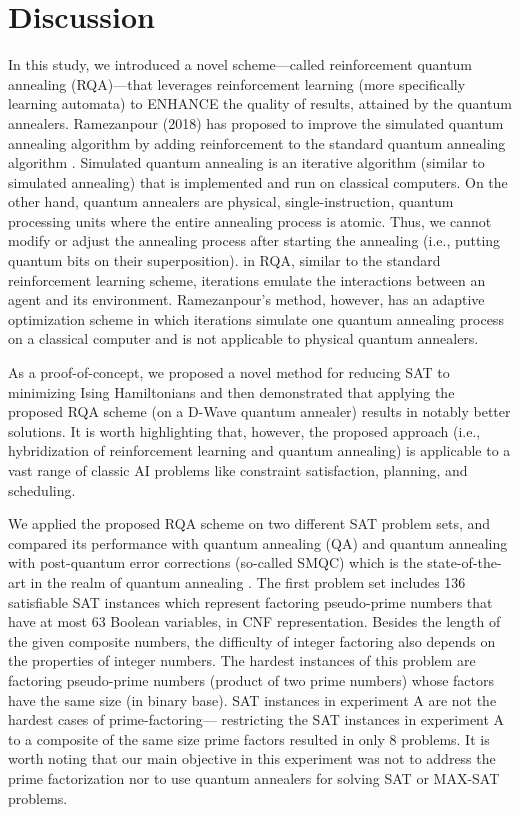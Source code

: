 \documentclass[fleqn,10pt]{wlscirep}
\begin{document}
\section*{Discussion}
In this study, we introduced a novel scheme—called reinforcement quantum annealing (RQA)—that leverages reinforcement learning (more specifically learning automata) to ENHANCE the quality of results, attained by the quantum annealers.
Ramezanpour (2018) has proposed to improve the simulated quantum annealing algorithm by adding reinforcement to the standard quantum annealing algorithm \cite{ramezanpour2018enhancing}. Simulated quantum annealing is an iterative algorithm (similar to simulated annealing) that is implemented and run on classical computers. On the other hand, quantum annealers are physical, single-instruction, quantum processing units where the entire annealing process is atomic. Thus, we cannot modify or adjust the annealing process after starting the annealing (i.e., putting quantum bits on their superposition). in RQA, similar to the standard reinforcement learning scheme, iterations emulate the interactions between an agent and its environment. Ramezanpour’s method, however, has an adaptive optimization scheme in which iterations simulate one quantum annealing process on a classical computer and is not applicable to physical quantum annealers.

As a proof-of-concept, we proposed a novel method for reducing SAT to minimizing Ising Hamiltonians and then demonstrated that applying the proposed RQA scheme (on a D-Wave quantum annealer) results in notably better solutions. It is worth highlighting that, however, the proposed approach (i.e., hybridization of reinforcement learning and quantum annealing) is applicable to a vast range of classic AI problems like constraint satisfaction, planning, and scheduling. 

We applied the proposed RQA scheme on two different SAT problem sets, and compared its performance with quantum annealing (QA) and quantum annealing with post-quantum error corrections (so-called SMQC) which is the state-of-the-art in the realm of quantum annealing \cite{golden2019pre,ayanzadeh2019quantum_assisted,dorband2018method}.
The first problem set includes 136 satisfiable SAT instances which represent factoring pseudo-prime numbers that have at most 63 Boolean variables, in CNF representation. Besides the length of the given composite numbers, the difficulty of integer factoring also depends on the properties of integer numbers. The hardest instances of this problem are factoring pseudo-prime numbers (product of two prime numbers) whose factors have the same size (in binary base). SAT instances in experiment A are not the hardest cases of prime-factoring— restricting the SAT instances in experiment A to a composite of the same size prime factors resulted in only 8 problems. It is worth noting that our main objective in this experiment was not to address the prime factorization nor to use quantum annealers for solving SAT or MAX-SAT problems.
\end{document}
